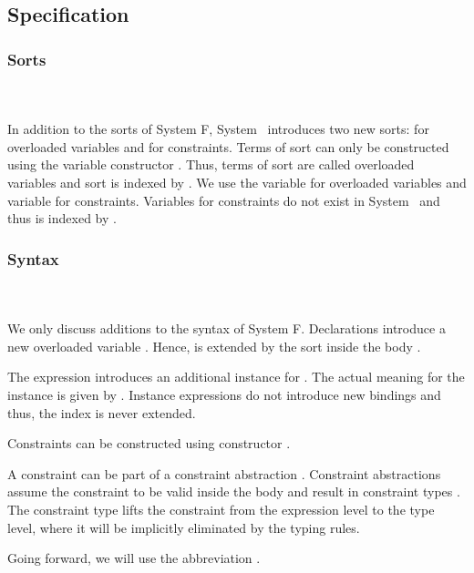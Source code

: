 \subsection{Specification}

\subsubsection{Sorts}\hfill\\\\
In addition to the sorts of System F, System \Fo\ introduces two new sorts:  for overloaded variables and  for constraints.
\FoSort
Terms of sort  can only be constructed using the variable constructor . Thus, terms of sort  are called overloaded variables and sort  is indexed by . We use the variable  for overloaded variables and variable  for constraints. 
Variables for constraints do not exist in System \Fo\ and thus  is indexed by . 

\subsubsection{Syntax}\hfill\\\\
We only discuss additions to the syntax of System F.
\FoTerm
Declarations   introduce a new overloaded variable . 
Hence,  is extended by the sort  inside the body . 

\noindent The expression   \Constr{=}    introduces an additional instance for . 
The actual meaning for the instance is given by .
Instance expressions do not introduce new bindings and thus, the index  is never extended.

\noindent Constraints  can be constructed using constructor  \Constr{:} . 

\noindent A constraint  can be part of a constraint abstraction \Constr{\lambdabar}   . Constraint abstractions assume the constraint  to be valid inside the body  and result in constraint types \Constr{[}  \Constr{]⇒} . The constraint type lifts the constraint from the expression level to the type level, where it will be implicitly eliminated by the typing rules.

\noindent Going forward, we will use the abbreviation \FoCstr.

